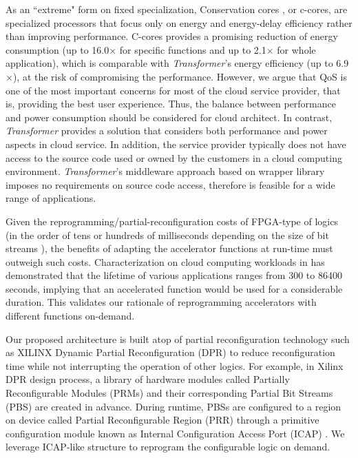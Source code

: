 As an ``extreme" form on fixed specialization, Conservation cores \cite{Venkatesh:2010:CCR:1735970.1736044,Venkatesh:2010:CCR:1736020.1736044,Venkatesh:2010:CCR:1735971.1736044}, or c-cores, are specialized processors that focus only on energy and energy-delay efficiency rather than improving performance. C-cores provides a promising reduction of energy consumption (up to 16.0$\times$ for specific functions and up to 2.1$\times$ for whole application), which is comparable with {\em Transformer}'s energy efficiency (up to 6.9$\times$), at the risk of compromising the performance. However, we argue that QoS is one of the most important concerns for most of the cloud service provider, that is, providing the best user experience. Thus, the balance between performance and power consumption should be considered for cloud architect. In contrast, {\em Transformer} provides a solution that considers both performance and power aspects in cloud service. In addition, the service provider typically does not have access to the source code used or owned by the customers in a cloud computing environment. {\em Transformer}'s middleware approach based on wrapper library imposes no requirements on source code access, therefore is feasible for a wide range of applications. 

Given the reprogramming/partial-reconfiguration costs of FPGA-type of
logics (in the order of tens or hundreds of milliseconds depending on
the size of bit streams \cite{Liu:2009ie}), the benefits of adapting
the accelerator functions at run-time must outweigh such
costs. Characterization on cloud computing workloads in
\cite{CloudWorkload} has demonstrated that the lifetime of various
applications ranges from 300 to 86400 seconds, implying that an
accelerated function would be used for a considerable duration.  This
validates our rationale of reprogramming accelerators with different
functions on-demand.

Our proposed architecture is built atop of partial reconfiguration
technology such as XILINX Dynamic Partial Reconfiguration (DPR)
\cite{PRUserGuide} to reduce reconfiguration time while not
interrupting the operation of other logics. For example, in Xilinx DPR
design process, a library of hardware modules called Partially
Reconfigurable Modules (PRMs) and their corresponding Partial Bit
Streams (PBS) are created in advance. 
During runtime, PBSs are configured to a region on device called
Partial Reconfigurable Region (PRR) through a primitive configuration
module known as Internal Configuration Access Port (ICAP)
\cite{Hansen:2011dt,Liu:2009ie,McDonald:2008ec}. We leverage ICAP-like
structure to reprogram the configurable logic on demand.



